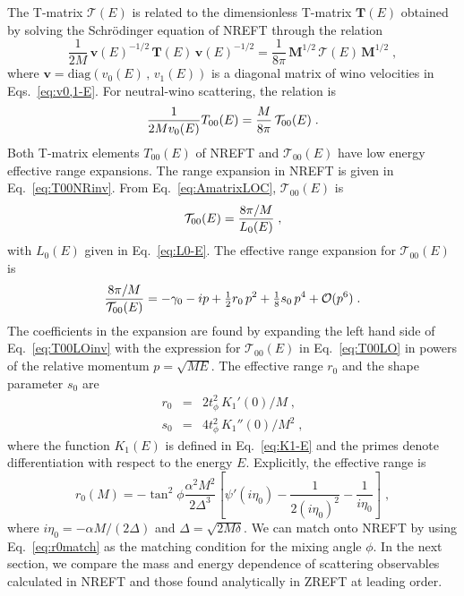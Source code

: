 \documentclass[%
 reprint,
 amsmath,amssymb,
 aps,
]{revtex4-1}
\begin{document}
The T-matrix $\bm{\mathcal{T}}(E)$ is related to the dimensionless T-matrix $\bm{T}(E)$ obtained by solving the Schr\"odinger equation of NREFT through the relation
\begin{equation}
\frac{1}{2M} \, \bm{v}(E)^{-1/2} \, \bm{T}(E)  \, \bm{v}(E)^{-1/2}= 
\frac{1}{8\pi} \, \bm{M}^{1/2} \, \bm{\mathcal{T}}(E) \, \bm{M}^{1/2} \;,
\label{eq:TNR-TZR}
\end{equation}
where $\bm{v} = \mathrm{diag}\left(v_0(E) \,,\, v_1(E)\right)$ is a diagonal matrix of wino velocities in Eqs.~\eqref{eq:v0,1-E}.
For neutral-wino scattering, the relation is
\begin{equation}
\frac{1}{2Mv_0(E)} T_{00}(E) = \frac{M}{8 \pi}\, {\cal T}_{00}(E) \;.
\label{eq:TNR-TZR00}
\end{equation}
Both T-matrix elements $T_{00}(E)$ of NREFT and $\mathcal{T}_{00}(E)$ have low energy effective range expansions.
The range expansion in NREFT is given in Eq.~\eqref{eq:T00NRinv}.
From Eq.~\eqref{eq:AmatrixLOC}, $\mathcal{T}_{00}(E)$ is
\begin{equation}
{\cal T}_{00}(E) = \frac{8\pi/M}{L_0(E)} \;,
\label{eq:T00LO}
\end{equation}
with $L_0(E)$ given in Eq.~\eqref{eq:L0-E}.
The effective range expansion for $\mathcal{T}_{00}(E)$ is
\begin{eqnarray}
\frac{8\pi/M}{{\cal T}_{00}(E)} =
-\gamma_0  - i p + \tfrac12 r_0 \, p^2+ \tfrac18 s_0 \, p^4  + {\cal O}(p^6) \;.
\label{eq:T00LOinv}
\end{eqnarray}
The coefficients in the expansion are found by expanding the left hand side of Eq.~\eqref{eq:T00LOinv} with the expression for $\mathcal{T}_{00}(E)$ in Eq.~\eqref{eq:T00LO} in powers of the relative momentum $p=\sqrt{ME}$.
The effective range $r_0$ and the shape parameter $s_0$ are
\begin{subequations}
\begin{eqnarray}
r_0 &=& 2 t_\phi^2\, K_1'(0)/M \;,
\label{eq:r0LO}
\\
s_0 &=& 4 t_\phi^2\, K_1''(0)/M^2 \;,
\label{eq:s0LO}
\end{eqnarray}
\label{eq:r0s0LO}%
\end{subequations}
where the function $K_1(E)$ is defined in Eq.~\eqref{eq:K1-E} and the primes denote differentiation with respect to the energy $E$.
Explicitly, the effective range is
\begin{equation}
r_0(M) = - \tan^2\phi \frac{\alpha^2M^2}{2 \Delta^3}
\left[ \psi'(i \eta_0) - \frac{1}{2(i \eta_0)^2} - \frac{1}{i \eta_0} \right] \;,
\label{eq:r0match}
\end{equation}
where $i \eta_0 = - \alpha M/(2 \Delta)$ and $\Delta = \sqrt{2 M \delta}$.
We can match onto NREFT by using Eq.~\eqref{eq:r0match} as the matching condition for the mixing angle $\phi$.
In the next section, we compare the mass and energy dependence of scattering observables calculated in NREFT and those found analytically in ZREFT at leading order.
\end{document}
